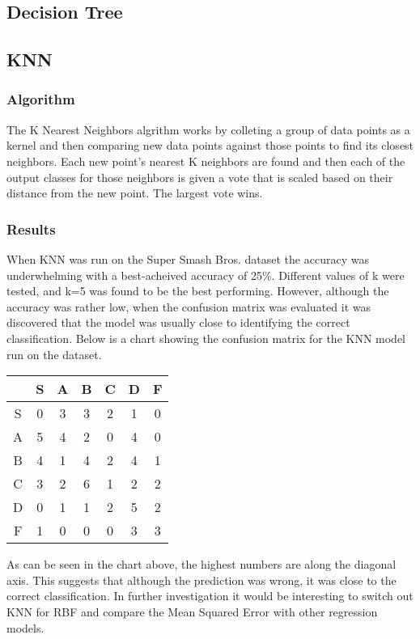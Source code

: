\documentclass{article}
\begin{document}
\subsection{Decision Tree}
\subsection{KNN}
\subsubsection{Algorithm}
The K Nearest Neighbors algrithm works by colleting a group of data points as a kernel and then comparing new data points against those points to find its closest neighbors. Each new point's nearest K neighbors are found and then each of the output classes for those neighbors is given a vote that is scaled based on their distance from the new point. The largest vote wins.
\subsubsection{Results}
When KNN was run on the Super Smash Bros. dataset the accuracy was underwhelming with a best-acheived accuracy of 25\%. Different values of k were tested, and k=5 was found to be the best performing. However, although the accuracy was rather low, when the confusion matrix was evaluated it was discovered that the model was usually close to identifying the correct classification. Below is a chart showing the confusion matrix for the KNN model run on the dataset.
\linebreak
\begin{center}
\begin{tabular}{c | c | c | c | c | c | c}
   & S & A & B & C & D & F \\ \hline
 S & 0 & 3 & 3 & 2 & 1 & 0 \\ \hline
 A & 5 & 4 & 2 & 0 & 4 & 0 \\ \hline
 B & 4 & 1 & 4 & 2 & 4 & 1 \\ \hline
 C & 3 & 2 & 6 & 1 & 2 & 2 \\ \hline
 D & 0 & 1 & 1 & 2 & 5 & 2 \\ \hline
 F & 1 & 0 & 0 & 0 & 3 & 3 \\ \hline
\end{tabular}
\end{center}
As can be seen in the chart above, the highest numbers are along the diagonal axis. This suggests that although the prediction was wrong, it was close to the correct classification. In further investigation it would be interesting to switch out KNN for RBF and compare the Mean Squared Error with other regression models.
\end{document}
